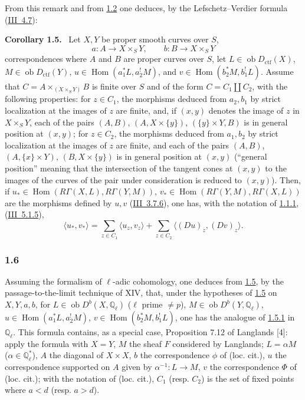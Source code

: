 \documentclass[11pt]{article}
\newenvironment{statement}[1]{\par\medskip\noindent\textbf{#1.}\ }{\par\medskip}
\DeclareMathOperator{\Hom}{Hom}
\newcommand{\ob}{\operatorname{ob}}
\providecommand{\ctf}{\mathrm{ctf}}
\providecommand{\Hom}{\operatorname{Hom}}
\providecommand{\ob}{\operatorname{ob}}
\providecommand{\Hom}{\operatorname{Hom}}
\begin{document}
From this remark and from \hyperref[sga5:IIIB:theorem:1.2]{1.2} one deduces, by the Lefschetz--Verdier formula (\hyperref[sga5:III:corollary:4.7]{III~4.7}):

\label{sga5:IIIB:corollary:1.5}\begin{statement}{Corollary 1.5}
Let $X,Y$ be proper smooth curves over $S$,
\[
a:A\longrightarrow X\times_S Y,
\qquad
b:B\longrightarrow X\times_S Y
\]
correspondences where $A$ and $B$ are proper curves over $S$, let $L\in\ob D_{\ctf}(X)$, $M\in\ob D_{\ctf}(Y)$, $u\in\Hom(a_1^*L,a_2^!M)$, and $v\in\Hom(b_2^*M,b_1^!L)$. Assume that $C=A\times_{(X\times_S Y)}B$ is finite over $S$ and of the form $C=C_1\amalg C_2$, with the following properties: for $z\in C_1$, the morphisms deduced from $a_2,b_1$ by strict localization at the images of $z$ are finite, and, if $(x,y)$ denotes the image of $z$ in $X\times_S Y$, each of the pairs $(A,B)$, $(A,X\times\{y\})$, $(\{y\}\times Y,B)$ is in general position at $(x,y)$; for $z\in C_2$, the morphisms deduced from $a_1,b_2$ by strict localization at the images of $z$ are finite, and each of the pairs $(A,B)$, $(A,\{x\}\times Y)$, $(B,X\times\{y\})$ is in general position at $(x,y)$ (``general position'' meaning that the intersection of the tangent cones at $(x,y)$ to the images of the curves of the pair under consideration is reduced to $(x,y)$). Then, if $u_*\in\Hom(R\Gamma(X,L),R\Gamma(Y,M))$, $v_*\in\Hom(R\Gamma(Y,M),R\Gamma(X,L))$ are the morphisms defined by $u,v$ (\hyperref[sga5:III:equation:3.7.6]{III~3.7.6}), one has, with the notation of \hyperref[sga5:IIIB:equation:1.1.1]{1.1.1}, (\hyperref[sga5:III:equation:5.1.5]{III~5.1.5}),
\begin{equation}\tag{1.5.1}\label{sga5:IIIB:equation:1.5.1}
\langle u_*,v_*\rangle=\sum_{z\in C_1}\langle u_z,v_z\rangle+\sum_{z\in C_2}\langle (Du)_z,(Dv)_z\rangle.
\end{equation}
\end{statement}

\subsubsection*{1.6}\label{sga5:IIIB:subsubsection:1.6}
Assuming the formalism of $\ell$-adic cohomology, one deduces from \hyperref[sga5:IIIB:corollary:1.5]{1.5}, by the passage-to-the-limit technique of XIV, that, under the hypotheses of \hyperref[sga5:IIIB:corollary:1.5]{1.5} on $X,Y,a,b$, for $L\in\ob D^b(X,\mathbb Q_\ell)$ ($\ell$ prime $\ne p$), $M\in\ob D^b(Y,\mathbb Q_\ell)$, $u\in\Hom(a_1^*L,a_2^!M)$, $v\in\Hom(b_2^*M,b_1^!L)$, one has the analogue of \hyperref[sga5:IIIB:equation:1.5.1]{1.5.1} in $\mathbb Q_\ell$. This formula contains, as a special case, Proposition 7.12 of Langlands [4]: apply the formula with $X=Y$, $M$ the sheaf $F$ considered by Langlands; $L=\alpha M$ ($\alpha\in\mathbb Q_\ell^*$), $A$ the diagonal of $X\times X$, $b$ the correspondence $\phi$ of (loc. cit.), $u$ the correspondence supported on $A$ given by $\alpha^{-1}:L\to M$, $v$ the correspondence $\Phi$ of (loc. cit.); with the notation of (loc. cit.), $C_1$ (resp. $C_2$) is the set of fixed points where $a<d$ (resp. $a>d$).
\end{document}
